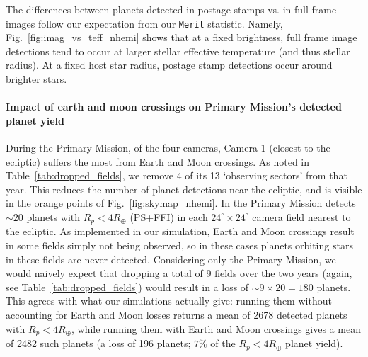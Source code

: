The differences between planets detected in postage stamps vs. in full frame images follow our expectation from our \texttt{Merit} statistic. 
Namely, Fig.~\ref{fig:imag_vs_teff_nhemi} shows that at a fixed brightness, full frame image detections tend to occur at larger stellar effective temperature (and thus stellar radius).
At a fixed host star radius, postage stamp detections occur around brighter stars.

\paragraph{Impact of earth and moon crossings on Primary Mission's detected planet yield}
During the Primary Mission, of the four cameras, Camera 1 (closest to the 
ecliptic) suffers the most from Earth and Moon crossings.
As noted in Table~\ref{tab:dropped_fields}, we remove 4 of its 13 
`observing sectors' from that year.
This reduces the number of planet detections near the ecliptic, and is visible in the orange points of Fig.~\ref{fig:skymap_nhemi}.
In the Primary Mission \tess detects $\sim20$ planets with $R_p<4R_\oplus$ 
(PS+FFI) in each $24^\circ\times24^\circ$ camera field nearest to the ecliptic.
As implemented in our simulation, Earth and Moon crossings result in some 
fields simply not being observed, so in these cases planets orbiting stars in 
these fields are never detected.
Considering only the Primary Mission, we would naively expect that dropping a total of 9 fields over the two years (again, see Table~\ref{tab:dropped_fields}) would result in a loss of $\sim9\times20=180$ planets.
This agrees with what our simulations actually give: running them without accounting for Earth and Moon losses returns a mean of 2678 detected planets with $R_p<4R_\oplus$, while running them with Earth and Moon crossings gives a mean of 2482 such planets (a loss of 196 planets; $7\%$ of the $R_p<4R_\oplus$ planet yield).
